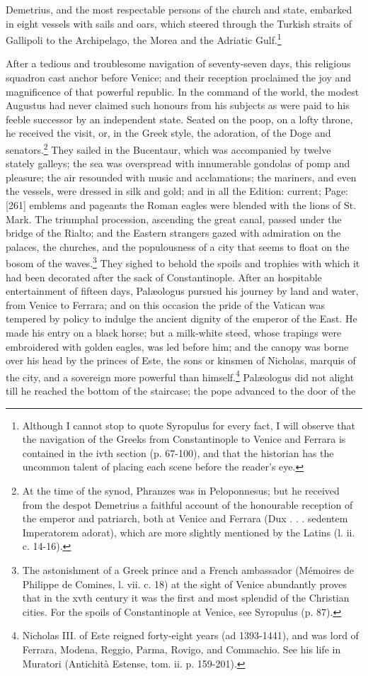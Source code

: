 Demetrius, and the most respectable persons of the church and state, embarked in eight vessels with sails and oars, which steered through the Turkish straits of Gallipoli to the Archipelago, the Morea and the Adriatic Gulf.\footnote{Although I cannot stop to quote Syropulus for every fact, I will observe that the navigation of the Greeks from Constantinople to Venice and Ferrara is contained in the ivth section (p. 67-100), and that the historian has the uncommon talent of placing each scene before the reader\texthebrew{}’s eye.}

After a tedious and troublesome navigation of seventy-seven days, this religious squadron cast anchor before Venice; and their reception proclaimed the joy and magnificence of that powerful republic. In the command of the world, the modest Augustus had never claimed such honours from his subjects as were paid to his feeble successor by an independent state. Seated on the poop, on a lofty throne, he received the visit, or, in the Greek style, the adoration, of the Doge and senators.\footnote{At the time of the synod, Phranzes was in Peloponnesus; but he received from the despot Demetrius a faithful account of the honourable reception of the emperor and patriarch, both at Venice and Ferrara (Dux . . . sedentem Imperatorem adorat), which are more slightly mentioned by the Latins (l. ii. c. 14-16).} They sailed in the Bucentaur, which was accompanied by twelve stately galleys; the sea was overspread with innumerable gondolas of pomp and pleasure; the air resounded with music and acclamations; the mariners, and even the vessels, were dressed in silk and gold; and in all the Edition: current; Page: [261] emblems and pageants the Roman eagles were blended with the lions of St. Mark. The triumphal procession, ascending the great canal, passed under the bridge of the Rialto; and the Eastern strangers gazed with admiration on the palaces, the churches, and the populousness of a city that seems to float on the bosom of the waves.\footnote{The astonishment of a Greek prince and a French ambassador (Mémoires de Philippe de Comines, l. vii. c. 18) at the sight of Venice abundantly proves that in the xvth century it was the first and most splendid of the Christian cities. For the spoils of Constantinople at Venice, see Syropulus (p. 87).} They sighed to behold the spoils and trophies with which it had been decorated after the sack of Constantinople. After an hospitable entertainment of fifteen days, Palæologus pursued his journey by land and water, from Venice to Ferrara; and on this occasion the pride of the Vatican was tempered by policy to indulge the ancient dignity of the emperor of the East. He made his entry on a black horse; but a milk-white steed, whose trapings were embroidered with golden eagles, was led before him; and the canopy was borne over his head by the princes of Este, the sons or kinsmen of Nicholas, marquis of the city, and a sovereign more powerful than himself.\footnote{Nicholas III. of Este reigned forty-eight years (ad 1393-1441), and was lord of Ferrara, Modena, Reggio, Parma, Rovigo, and Commachio. See his life in Muratori (Antichità Estense, tom. ii. p. 159-201).} Palæologus did not alight till he reached the bottom of the staircase; the pope advanced to the door of the 
